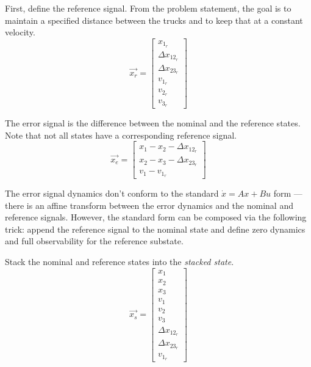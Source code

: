 \documentclass[12pt,onecolumn,reqno]{amsart}
\begin{document}
First, define the reference signal. From the problem statement, the goal is to
maintain a specified distance between the trucks and to keep that at a constant
velocity.
\begin{equation}
  \vec{x_{r}} = 
  \begin{bmatrix}
    x_{1_{r}}         \\
    \Delta x_{12_{r}} \\
    \Delta x_{23_{r}} \\
    v_{1_{r}}         \\
    v_{2_{r}}         \\
    v_{3_{r}}
  \end{bmatrix}
\end{equation}

The error signal is the difference between the nominal and the reference states.
Note that not all states have a corresponding reference signal.
\begin{equation}
  \vec{x_{e}} = 
  \begin{bmatrix}
    x_{1} - x_{2} - \Delta x_{12_{r}} \\
    x_{2} - x_{3} - \Delta x_{23_{r}} \\
    v_{1} - v_{1_{r}}
  \end{bmatrix}
\end{equation}

The error signal dynamics don't conform to the standard $\dot{x} = Ax + Bu$ form
--- there is an affine transform between the error dynamics and the nominal and
reference signals. However, the standard form can be composed via the following
trick: append the reference signal to the nominal state and define zero dynamics
and full observability for the reference substate.

Stack the nominal and reference states into the \textit{stacked state}.
\begin{equation}
  \vec{x_{s}} = 
  \begin{bmatrix}
    x_{1}             \\
    x_{2}             \\
    x_{3}             \\
    v_{1}             \\
    v_{2}             \\
    v_{3}             \\ 
    \Delta x_{12_{r}} \\
    \Delta x_{23_{r}} \\
    v_{1_{r}}
  \end{bmatrix}
\end{equation}
\end{document}
